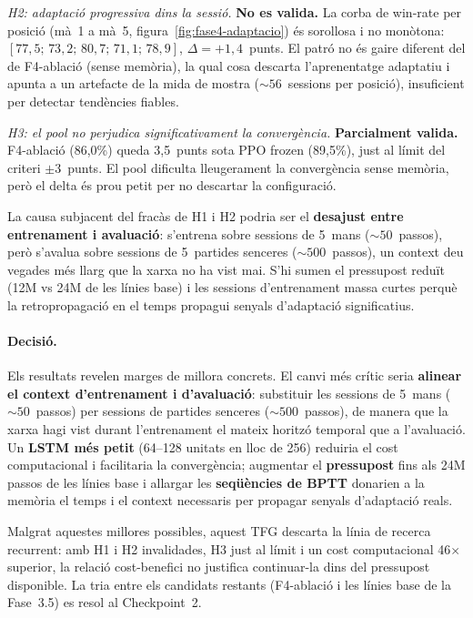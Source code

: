\emph{H2: adaptació progressiva dins la sessió.} \textbf{No es valida.}
La corba de win-rate per posició (mà~1 a mà~5, figura~\ref{fig:fase4-adaptacio}) és
sorollosa i no monòtona: $[77{,}5;\,73{,}2;\,80{,}7;\,71{,}1;\,78{,}9]$,
$\Delta = +1{,}4$~punts. El patró no és gaire diferent del de F4-ablació (sense memòria),
la qual cosa descarta l'aprenentatge adaptatiu i apunta a un artefacte de la mida de
mostra (${\sim}56$~sessions per posició), insuficient per detectar tendències fiables.

\emph{H3: el pool no perjudica significativament la convergència.} \textbf{Parcialment
valida.} F4-ablació (86{,}0\%) queda 3{,}5~punts sota PPO frozen (89{,}5\%), just al
límit del criteri $\pm3$~punts. El pool dificulta lleugerament la convergència sense
memòria, però el delta és prou petit per no descartar la configuració.

La causa subjacent del fracàs de H1 i H2 podria ser el \textbf{desajust entre entrenament i
avaluació}: s'entrena sobre sessions de 5~mans (${\sim}50$~passos), però s'avalua sobre
sessions de 5~partides senceres (${\sim}500$~passos), un context deu vegades més llarg que
la xarxa no ha vist mai. S'hi sumen el pressupost reduït (12M vs 24M de les línies base)
i les sessions d'entrenament massa curtes perquè la retropropagació en el temps propagui
senyals d'adaptació significatius.

\paragraph{Decisió.} Els resultats revelen marges de millora concrets. El canvi més crític
seria \textbf{alinear el context d'entrenament i d'avaluació}: substituir les sessions de
5~mans (${\sim}50$~passos) per sessions de partides senceres (${\sim}500$~passos), de
manera que la xarxa hagi vist durant l'entrenament el mateix horitzó temporal que a
l'avaluació. Un \textbf{\ac{LSTM} més petit} (64--128 unitats en lloc de 256) reduiria
el cost computacional i facilitaria la convergència; augmentar el \textbf{pressupost} fins
als 24M passos de les línies base i allargar les \textbf{seqüències de BPTT} donarien a
la memòria el temps i el context necessaris per propagar senyals d'adaptació reals.

Malgrat aquestes millores possibles, aquest \ac{TFG} descarta la línia de recerca
recurrent: amb H1 i H2 invalidades, H3 just al límit i un cost computacional 46$\times$
superior, la relació cost-benefici no justifica continuar-la dins del pressupost disponible.
La tria entre els candidats restants (F4-ablació i les línies base de la Fase~3.5) es
resol al Checkpoint~2.

